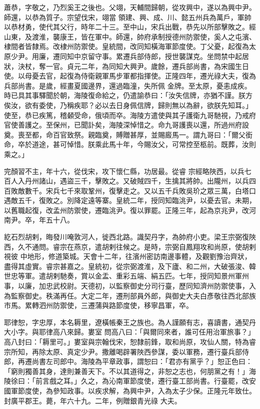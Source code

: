 \begin{pinyinscope}
 蕭恭，字敬之，乃烈奚王之後也。父翊，天輔間歸朝，從攻興中，遂以為興中尹。師還，以恭為質子。宗望伐宋，翊當
 領建、興、成、川、懿五州兵為萬戶，軍帥以恭材勇，使代其父行，時年二十三。至中山，宋兵出戰，恭先以所部擊敗之。經山東，及渡淮，襲康王，皆在軍中。師還，帥府承制授德州防禦使，奚人之屯濱、棣間者皆隸焉。改棣州防禦使。皇統間，改同知橫海軍節度使。丁父憂，起復為太原少尹。用廉，遷同知中京留守事。累遷兵部侍郎，授世襲謀克。坐問禁中起居狀，決杖，奪一官。貞元二年，為同知大興尹。歲餘，遷兵部尚書，為宋國生日使。以母憂去官，起復為侍衛親軍馬步軍都指揮使。正隆四年，遷光祿大夫，復為兵部尚書。是歲，經畫夏國邊界，還過臨潼，失所佩
 金牌。至太原，憂恚成疾。時已具其事驛聞於朝，海陵復命給之，仍遣諭恭曰：「汝失信牌，亦猶不謹。朕方俟汝，欲有委使，乃稱疾耶？必以去日身佩信牌，歸則無以為辭，欲朕先知耳。」使至，恭已疾篤，稽顙受命，俄頃而卒。海陵方遣使與其子護衛九哥馳視，乃戒府官使善護之。至保州，已聞訃矣，海陵深悼惜之。命九哥護喪以還，所過州府設奠。喪至都，命百官致祭。親臨奠，賻贈甚厚，並賜廄馬一。謂九哥曰：「爾父銜命，卒於道途，甚可悼惜。朕乘此馬十年，今賜汝父，可常控至柩前。既葬，汝則乘之。」



 完顏習不主，年十六，從伐宋，攻下懷仁縣，功居最。從睿
 宗經略陜西，以兵七百人入丹州諸山，遇盜三千，擊敗之。又破賊四千，生擒其將帥。出隴州，以兵四百敗敵數千。宋兵七千來取鞏州，復擊走之。又以五千兵敗吳玠之眾三萬，白塔口遇敵五千，復敗之。別降定遠等寨。皇統二年，授同知臨洮尹，以憂去官。未期，以舊職起復，改孟州防禦使，遷臨洮尹。復以罪罷。正隆三年，起為京兆尹，改河南尹。卒，年五十八。



 紇石烈胡剌，晦發川唵敦河人，徙西北路。識契丹字，為帥府小吏。梁王宗弼復陜西，久不通問。睿宗在燕京，遣胡剌往候之。是時，宗弼自鳳翔攻和尚原，使胡剌視彼
 中地形，修道築城。天會十二年，往濱州密訪南邊事體，及觀劉豫治齊狀，盡得其虛實。睿宗甚嘉之。皇統初，從宗弼渡淮，及下廬、和二州，大破張浚、韓世忠等軍。遣胡剌馳奏，賞以金盂、重彩五端、絹五匹。七年，授同知景州軍州事，以廉，加忠武校尉。天德初，以監察御史分司行臺，歷同知濟州防禦使事，入為監察御史。秩滿再任。大定二年，遷刑部員外郎，與御史大夫白彥敬往西北部族市馬。累轉泗州防禦使，三遷蒲與路節度使，移寧昌軍，卒。



 耶律恕，字忠厚，本名耨里，遼橫帳秦王之族也。為人謹願有志，喜讀書，通契丹大小字。與耶律高八來歸。婁室
 問高八曰：「與爾同來者，誰可任用治軍旅事？」高八封曰：「耨里可。」婁室與宗翰伐宋，恕隸前鋒，取和尚原，攻仙人關，特為睿宗所知，再除太原、真定少尹。撒離喝辟署陜西參謀，委以軍務，遷行臺兵部侍郎，再遷尚書左司郎中。海陵為平章政事，謂恕曰：「君亦有黨乎？」恕正色曰：「窮則獨善其身，達則兼善天下。不以其道得之，非恕之志也，何朋黨之有！」海陵徐曰：「前言戲之耳。」久之，為沁南軍節度使，遷行臺工部尚書。行臺罷，改安國軍節度使，為參知政事。以疾求解，為興中尹，入為太子少保。正隆元年致仕。封廣平郡王。薨，年六十九。二年，例贈銀青光祿
 大夫。




\end{pinyinscope}
